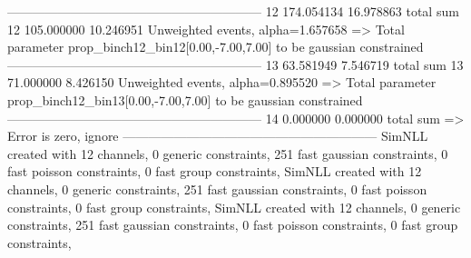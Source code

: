 ------------------------------------------------------------
12         174.054134      16.978863       total sum                     
12         105.000000      10.246951       Unweighted events, alpha=1.657658
  => Total parameter prop_binch12_bin12[0.00,-7.00,7.00] to be gaussian constrained
------------------------------------------------------------
13         63.581949       7.546719        total sum                     
13         71.000000       8.426150        Unweighted events, alpha=0.895520
  => Total parameter prop_binch12_bin13[0.00,-7.00,7.00] to be gaussian constrained
------------------------------------------------------------
14         0.000000        0.000000        total sum                     
  => Error is zero, ignore      
------------------------------------------------------------
SimNLL created with 12 channels, 0 generic constraints, 251 fast gaussian constraints, 0 fast poisson constraints, 0 fast group constraints, 
SimNLL created with 12 channels, 0 generic constraints, 251 fast gaussian constraints, 0 fast poisson constraints, 0 fast group constraints, 
SimNLL created with 12 channels, 0 generic constraints, 251 fast gaussian constraints, 0 fast poisson constraints, 0 fast group constraints, 
